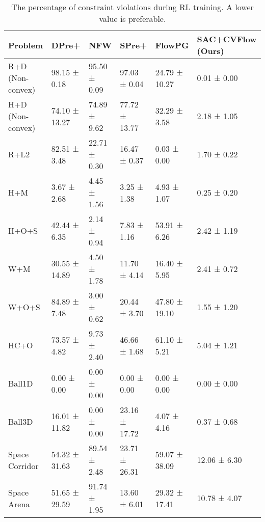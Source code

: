 \begin{table}
        \begin{center}
                \begin{tabular}{|l|l|l|l|l|l|}
                        \hline
                        Problem & DPre+ & NFW & SPre+ & FlowPG & SAC+CVFlow (Ours) \\
                        \hline
                        R+D (Non-convex) & 98.15 ± 0.18 & 95.50 ± 0.09 & 97.03 ± 0.04 & 24.79 ± 10.27 & 0.01 ± 0.00 \\
                        \hline
                        H+D (Non-convex) & 74.10 ± 13.27 & 74.89 ± 9.62 & 77.72 ± 13.77 & 32.29 ± 3.58 & 2.18 ± 1.05 \\
                        \hline
                        R+L2 & 82.51 ± 3.48 & 22.71 ± 0.30 & 16.47 ± 0.37 & 0.03 ± 0.00 & 1.70 ± 0.22 \\
                        \hline
                        H+M & 3.67 ± 2.68 & 4.45 ± 1.56 & 3.25 ± 1.38 & 4.93 ± 1.07 & 0.25 ± 0.20 \\
                        \hline
                        H+O+S & 42.44 ± 6.35 & 2.14 ± 0.94 & 7.83 ± 1.16 & 53.91 ± 6.26 & 2.42 ± 1.19 \\
                        \hline
                        W+M & 30.55 ± 14.89 & 4.50 ± 1.78 & 11.70 ± 4.14 & 16.40 ± 5.95 & 2.41 ± 0.72 \\
                        \hline
                        W+O+S & 84.89 ± 7.48 & 3.00 ± 0.62 & 20.44 ± 3.70 & 47.80 ± 19.10 & 1.55 ± 1.20 \\
                        \hline
                        HC+O & 73.57 ± 4.82 & 9.73 ± 2.40 & 46.66 ± 1.68 & 61.10 ± 5.21 & 5.04 ± 1.21 \\
                        \hline\hline
                        Ball1D & 0.00 ± 0.00 & 0.00 ± 0.00 & 0.00 ± 0.00 & 0.00 ± 0.00 & 0.00 ± 0.00 \\
                        \hline  
                        Ball3D & 16.01 ± 11.82 & 0.00 ± 0.00  & 23.16 ± 17.72 & 4.07 ± 4.16 & 0.37 ± 0.68 \\
                        \hline   
                        Space Corridor & 54.32 ± 31.63 & 89.54 ± 2.48 & 23.71 ± 26.31 & 59.07 ± 38.09 & 12.06 ± 6.30 \\
                        \hline  
                        Space Arena & 51.65 ± 29.59 & 91.74 ± 1.95 & 13.60 ± 6.01 & 29.32 ± 17.41 & 10.78 ± 4.07 \\
                        \hline
                \end{tabular}
        \end{center}
        \caption{The percentage of constraint violations during RL training. A lower value is preferable.}
        \label{tab:--}
\end{table}



